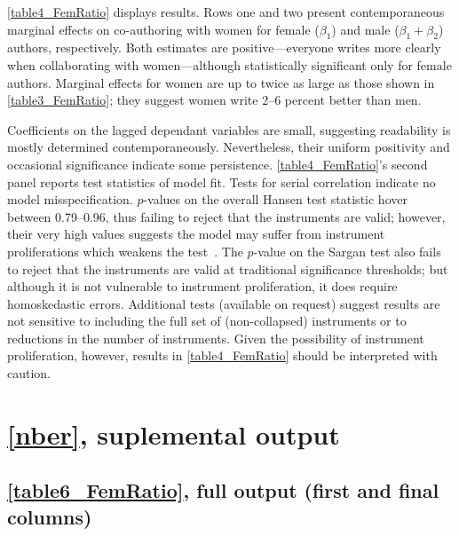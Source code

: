\begin{appendices}
\begin{refsection}
\autoref{table4_FemRatio} displays results. Rows one and two present contemporaneous marginal effects on co-authoring with women for female ($\beta_1$) and male ($\beta_1+\beta_2$) authors, respectively. Both estimates are positive---everyone writes more clearly when collaborating with women---although statistically significant only for female authors. Marginal effects for women are up to twice as large as those shown in \autoref{table3_FemRatio}; they suggest women write 2--6 percent better than men.

Coefficients on the lagged dependant variables are small, suggesting readability is mostly determined contemporaneously. Nevertheless, their uniform positivity and occasional significance indicate some persistence. \autoref{table4_FemRatio}'s second panel reports test statistics of model fit. Tests for serial correlation indicate no model misspecification. $p$-values on the overall Hansen test statistic hover between 0.79--0.96, thus failing to reject that the instruments are valid; however, their very high values suggests the model may suffer from instrument proliferations which weakens the test~\citep[for a discussion, see][]{Roodman2009a}. The $p$-value on the Sargan test also fails to reject that the instruments are valid at traditional significance thresholds; but although it is not vulnerable to instrument proliferation, it does require homoskedastic errors. Additional tests (available on request) suggest results are not sensitive to including the full set of (non-collapsed) instruments or to reductions in the number of instruments. Given the possibility of instrument proliferation, however, results in \autoref{table4_FemRatio} should be interpreted with caution.



\clearpage


\section{\autoref{nber}, suplemental output}
\label{appendixnber}

\subsection{\autoref{table6_FemRatio}, full output (first and final columns)}
\label{appendixdraftcorr}


\end{refsection}
\end{appendices}
